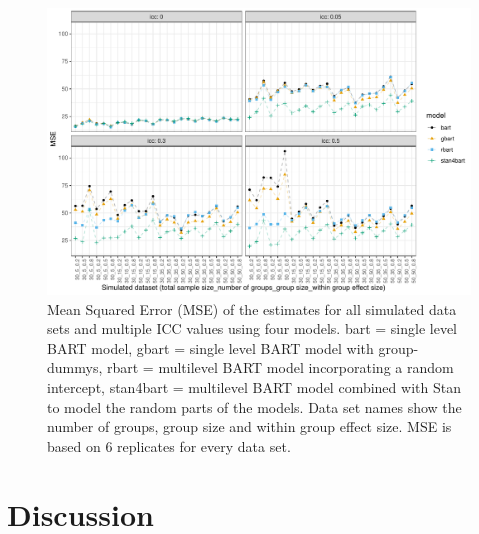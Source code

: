 \documentclass[10pt, a4paper, titlepage]{article}
\begin{document}
\begin{figure}[H]
\caption{Mean Squared Error (MSE) of the estimates for all simulated data sets and multiple ICC values using four models. bart = single level BART model, gbart = single level BART model with group-dummys, rbart = multilevel BART model incorporating a random intercept, stan4bart = multilevel BART model combined with Stan to model the random parts of the models. Data set names show the number of groups, group size and within group effect size. MSE is based on 6 replicates for every data set.}
\centering
\label{fig:mseplots}
\includegraphics[width=\textwidth]{mseplots3.pdf}
\end{figure}

\newpage
\section{Discussion}

\newpage


\end{document}
